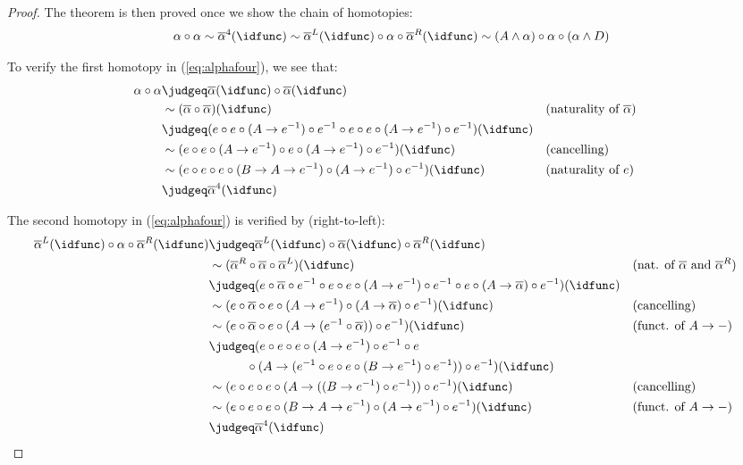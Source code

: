 \documentclass{article}
\newcommand{\smsh}{\wedge}
\renewcommand{\o}{\ensuremath{\circ}}
\newcommand{\sy}{^{-1}}
\newcommand{\alphabar}{\overline{\alpha}}
\begin{document}
\begin{proof}
	The theorem is then proved once we show the chain of homotopies:
	\begin{equation}\label{eq:alphafour}
	\alpha \o \alpha
	\sim \alphabar^4(\idfunc)
	\sim \alphabar^L(\idfunc) \o \alpha \o \alphabar^R(\idfunc)
	\sim (A \smsh \alpha) \o \alpha \o (\alpha \smsh D)
	\end{equation}
	
	To verify the first homotopy in (\ref{eq:alphafour}), we see that:
	\begin{align*}
		\alpha \o \alpha
		&\judgeq \alphabar(\idfunc) \o \alphabar(\idfunc)\\
		&\sim (\alphabar \o \alphabar) (\idfunc) &&\text{(naturality of $\alphabar$)}\\
		&\judgeq (e \o e \o (A \to e\sy) \o e\sy \o e \o e \o (A \to e\sy) \o e\sy)(\idfunc)\\
		&\sim (e \o e \o (A \to e\sy) \o e \o (A \to e\sy) \o e\sy)(\idfunc) &&\text{(cancelling)}\\
		&\sim (e \o e \o e \o (B \to A \to e\sy) \o (A \to e\sy) \o e\sy)(\idfunc) &&\text{(naturality of $e$)}\\
		&\judgeq \alphabar^4(\idfunc)
	\end{align*}		

	The second homotopy in (\ref{eq:alphafour}) is verified by (right-to-left):
	\begin{align*}
		\alphabar^L(\idfunc) \o \alpha \o \alphabar^R(\idfunc)
		&\judgeq \alphabar^L(\idfunc) \o \alphabar(\idfunc) \o \alphabar^R(\idfunc)\\
		&\sim (\alphabar^R \o \alphabar \o \alphabar^L)(\idfunc) &&\text{(nat. of $\alphabar$ and $\alphabar^R$)}\\
		&\judgeq (e \o \alphabar \o e\sy \o e \o e \o (A \to e\sy) \o e\sy \o e \o (A \to \alphabar) \o e\sy)(\idfunc)\\
		&\sim (e \o \alphabar \o e \o (A \to e\sy) \o (A \to \alphabar) \o e\sy)(\idfunc) &&\text{(cancelling)}\\
		&\sim (e \o \alphabar \o e \o (A \to (e\sy \o \alphabar)) \o e\sy)(\idfunc) &&\text{(funct. of $A\to -$)}\\
		&\judgeq (e \o e \o e \o (A \to e\sy) \o e\sy \o e \\
		&\hspace{3em}\o (A \to (e\sy \o e \o e \o (B \to e\sy) \o e\sy)) \o e\sy)(\idfunc)\\
		&\sim (e \o e \o e \o (A \to ((B \to e\sy) \o e\sy)) \o e\sy)(\idfunc) &&\text{(cancelling)}\\
		&\sim (e \o e \o e \o (B \to A \to e\sy) \o (A \to e\sy) \o e\sy)(\idfunc) &&\text{(funct. of $A \to -$)}\\
		&\judgeq \alphabar^4(\idfunc)
	\end{align*}
	

\end{proof}
\end{document}
